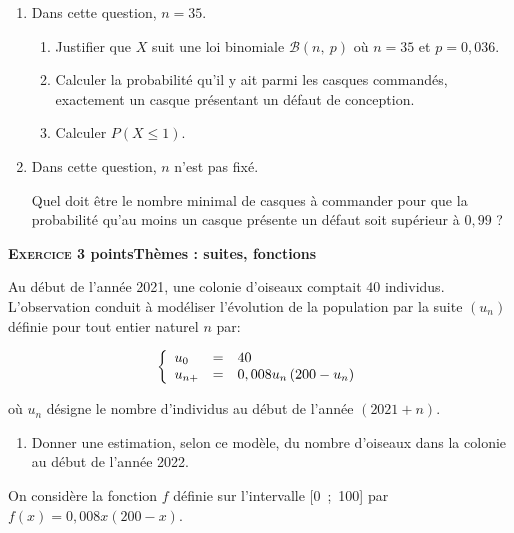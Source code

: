 \documentclass[10pt,a4paper]{article}
\begin{document}
\medskip

\begin{enumerate}
    \item Dans cette question, $n = 35$.
          \begin{enumerate}
              \item Justifier que $X$ suit une loi binomiale $\mathcal{B}(n,~p)$ où $n = 35$ et $p = 0,036$.
              \item Calculer la probabilité qu'il y ait parmi les casques commandés, exactement un casque présentant un défaut de conception.
              \item Calculer $P(X \leqslant 1)$.
          \end{enumerate}
    \item Dans cette question, $n$ n'est pas fixé.

          Quel doit être le nombre minimal de casques à commander pour que la probabilité
          qu'au moins un casque présente un défaut soit supérieur à $0,99$ ?
\end{enumerate}

\lipsum
\newpage

\textbf{\textsc{Exercice 3}  points\hfill Thèmes : suites, fonctions}

\medskip

Au début de l'année 2021, une colonie d'oiseaux comptait $40$ individus. L'observation conduit à modéliser l'évolution de la population par la suite $\left(u_n\right)$ définie pour tout entier naturel $n$ par:

\[\left\{\begin{array}{l c l}
        u_0 & = & 40 \\u_{n+}&=&0,008u_n\left(200 - u_n\right)
    \end{array}\right.\]

où $u_n$ désigne le nombre d'individus au début de l'année $(2021+n)$.

\medskip


\begin{enumerate}
    \item Donner une estimation, selon ce modèle, du nombre d'oiseaux dans la colonie au
          début de l'année 2022.
\end{enumerate}

On considère la fonction $f$ définie sur l'intervalle [0~;~100] par $f(x) = 0,008x(200 - x)$.
\end{document}
